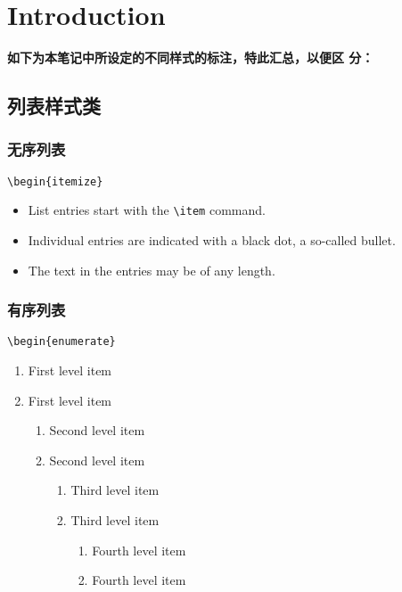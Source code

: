 \chapter{Introduction}
\label{cp:introduction}

\textbf{如下为本笔记中所设定的不同样式的标注，特此汇总，以便区
分：}

\section{列表样式类}
\subsection{无序列表}
\verb|\begin{itemize}|
\begin{itemize}
  \item List entries start with the \verb|\item| command.
  \item Individual entries are indicated with a black dot, a so-called bullet.
  \item The text in the entries may be of any length.
\end{itemize}

\subsection{有序列表}
\verb|\begin{enumerate}|
\begin{enumerate}%
    \item First level item
    \item First level item
    \begin{enumerate}%
        \item Second level item
        \item Second level item
            \begin{enumerate}%
                \item Third level item
                \item Third level item
                    \begin{enumerate}%
                        \item Fourth level item
                        \item Fourth level item
                    \end{enumerate}
            \end{enumerate}
    \end{enumerate}
\end{enumerate}


